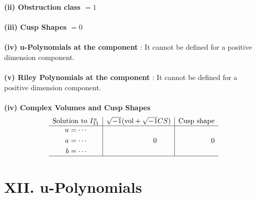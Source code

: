 \documentclass[1p]{elsarticle_modified}
\theoremstyle{definition}
\newcommand{\I}{\sqrt{-1}}
\begin{document}
\flushleft \textbf{(ii) Obstruction class $= 1$}\\~\\
\flushleft \textbf{(iii) Cusp Shapes $= 0$}\\~\\
\flushleft \textbf{(iv) u-Polynomials at the component} : It cannot be defined for a positive dimension component.\\~\\
\flushleft \textbf{(v) Riley Polynomials at the component} : It cannot be defined for a positive dimension component.\\~\\
\newpage\flushleft \textbf{(iv) Complex Volumes and Cusp Shapes}
$$\begin{array}{c|c|c} 
\text{Solution to }I^u_{11}& \I (\text{vol} + \sqrt{-1}CS) & \text{Cusp shape}\\
 \hline 
\begin{aligned}
u &= \cdots \\
a &= \cdots \\
b &= \cdots\end{aligned}
 & \phantom{-0.000000 } 0 & \phantom{-0.000000 } 0\\
 \hline 
 \end{array}
$$
\newpage\renewcommand{\arraystretch}{1}
\centering \section*{ XII. u-Polynomials}
\end{document}

